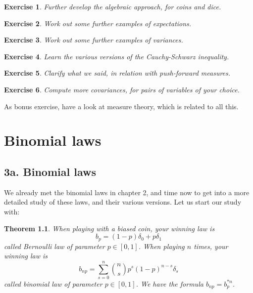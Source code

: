 \documentclass[12pt]{amsbook}
\newtheorem{theorem}{Theorem}[chapter]
\newtheorem{exercise}[theorem]{Exercise}
\begin{document}
\begin{exercise}
Further develop the algebraic approach, for coins and dice.
\end{exercise}

\begin{exercise}
Work out some further examples of expectations.
\end{exercise}

\begin{exercise}
Work out some further examples of variances.
\end{exercise}

\begin{exercise}
Learn the various versions of the Cauchy-Schwarz inequality.
\end{exercise}

\begin{exercise}
Clarify what we said, in relation with push-forward measures.
\end{exercise}

\begin{exercise}
Compute more covariances, for pairs of variables of your choice.
\end{exercise}

As bonus exercise, have a look at measure theory, which is related to all this.

\chapter{Binomial laws}

\section*{3a. Binomial laws}

We already met the binomial laws in chapter 2, and time now to get into a more detailed study of these laws, and their various versions. Let us start our study with:


\begin{theorem}
When playing with a biased coin, your winning law is
$$b_p=(1-p)\delta_0+p\delta_1$$
called Bernoulli law of parameter $p\in[0,1]$. When playing $n$ times, your winning law is
$$b_{np}=\sum_{s=0}^n\binom{n}{s}p^s(1-p)^{n-s}\delta_s$$
called binomial law of parameter $p\in[0,1]$. We have the formula $b_{np}=b_p^{*n}$.
\end{theorem}
\end{document}
